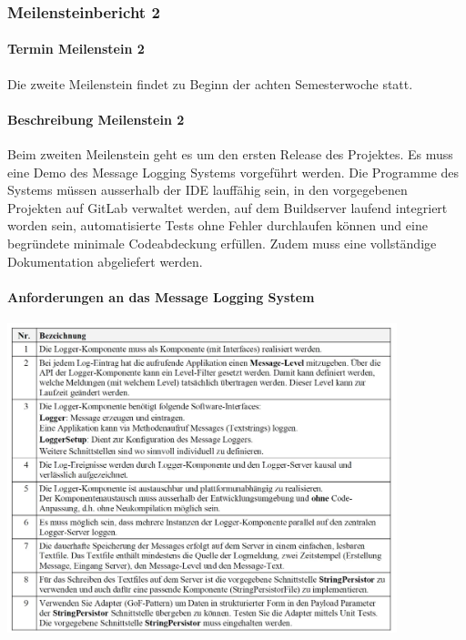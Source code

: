 \documentclass[11pt]{article}
\begin{document}
\subsubsection{Meilensteinbericht 2}
\paragraph{Termin Meilenstein 2}
Die zweite Meilenstein findet zu Beginn der achten Semesterwoche statt.

\paragraph{Beschreibung Meilenstein 2}
Beim zweiten Meilenstein geht es um den ersten Release des Projektes. Es muss eine Demo des
Message Logging Systems vorgeführt werden. Die Programme des Systems müssen ausserhalb der
IDE lauffähig sein, in den vorgegebenen Projekten auf GitLab verwaltet werden, auf dem Buildserver
laufend integriert worden sein, automatisierte Tests ohne Fehler durchlaufen können und eine
begründete minimale Codeabdeckung erfüllen. Zudem muss eine vollständige Dokumentation
abgeliefert werden.

\paragraph{Anforderungen an das Message Logging System}
\begin{center}
	\includegraphics[height=9cm,keepaspectratio]{images/meilenstein1.JPG}
\end{center}
\end{document}
